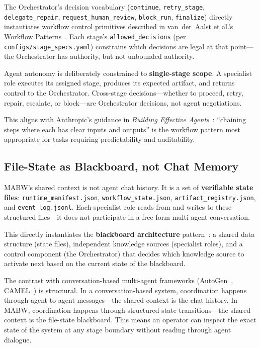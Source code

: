 \documentclass[11pt,a4paper]{article}
\begin{document}
The Orchestrator's decision vocabulary (\texttt{continue}, \texttt{retry\_stage}, \texttt{delegate\_repair}, \texttt{request\_human\_review}, \texttt{block\_run}, \texttt{finalize}) directly instantiates workflow control primitives described in van~der~Aalst et al.'s Workflow Patterns~\cite{vanderaalst2003}. Each stage's \texttt{allowed\_decisions} (per \texttt{configs/stage\_specs.yaml}) constrains which decisions are legal at that point---the Orchestrator has authority, but not unbounded authority.

Agent autonomy is deliberately constrained to \textbf{single-stage scope}. A specialist role executes its assigned stage, produces its expected artifact, and returns control to the Orchestrator. Cross-stage decisions---whether to proceed, retry, repair, escalate, or block---are Orchestrator decisions, not agent negotiations.

This aligns with Anthropic's guidance in \textit{Building Effective Agents}~\cite{anthropic2024agents}: ``chaining steps where each has clear inputs and outputs'' is the workflow pattern most appropriate for tasks requiring predictability and auditability.

\subsection{File-State as Blackboard, not Chat Memory}

MABW's shared context is not agent chat history. It is a set of \textbf{verifiable state files}: \texttt{runtime\_manifest.json}, \texttt{workflow\_state.json}, \texttt{artifact\_registry.json}, and \texttt{event\_log.jsonl}. Each specialist role reads from and writes to these structured files---it does not participate in a free-form multi-agent conversation.

This directly instantiates the \textbf{blackboard architecture} pattern~\cite{nii1986}: a shared data structure (state files), independent knowledge sources (specialist roles), and a control component (the Orchestrator) that decides which knowledge source to activate next based on the current state of the blackboard.

The contrast with conversation-based multi-agent frameworks (AutoGen~\cite{wu2023autogen}, CAMEL~\cite{li2023camel}) is structural. In a conversation-based system, coordination happens through agent-to-agent messages---the shared context is the chat history. In MABW, coordination happens through structured state transitions---the shared context is the file-state blackboard. This means an operator can inspect the exact state of the system at any stage boundary without reading through agent dialogue.
\end{document}
